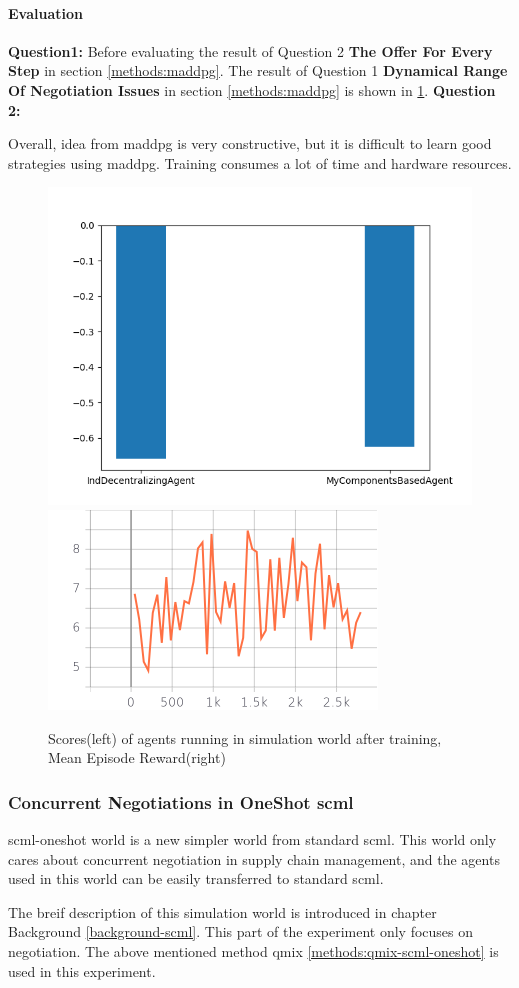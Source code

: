 \paragraph{Evaluation} \textbf{Question1:} Before evaluating the result of Question 2 \textbf{The Offer For Every Step} in section \ref{methods:maddpg}. The result of Question 1 \textbf{Dynamical Range Of Negotiation Issues} in section \ref{methods:maddpg} is shown in \ref{fig:dynamical-range-issues-maddpg}. \textbf{Question 2:} 
 
Overall, idea from maddpg is very constructive, but it is difficult to learn good strategies using maddpg. Training consumes a lot of time and hardware resources.


\begin{figure}
    \includegraphics[width=.45\textwidth]{./images/dynamic_range_issues_maddpg.png}\hfill
    \includegraphics[width=.49\textwidth]{./images/dynamical_mean_episode_reward.png}
    \caption{Scores(left) of agents running in simulation world after training, Mean Episode Reward(right)}
		\label{fig:dynamical-range-issues-maddpg}
\end{figure}

\subsubsection{Concurrent Negotiations in OneShot \gls{scml}}
\gls{scml-oneshot} world is a new simpler world from standard scml. This world only cares about concurrent negotiation in supply chain management, and the agents used in this world can be easily transferred to standard scml. 
 
The breif description of this simulation world is introduced in chapter Background \ref{background-scml}. This part of the experiment only focuses on negotiation. The above mentioned method qmix \ref{methods:qmix-scml-oneshot} is used in this experiment. 

